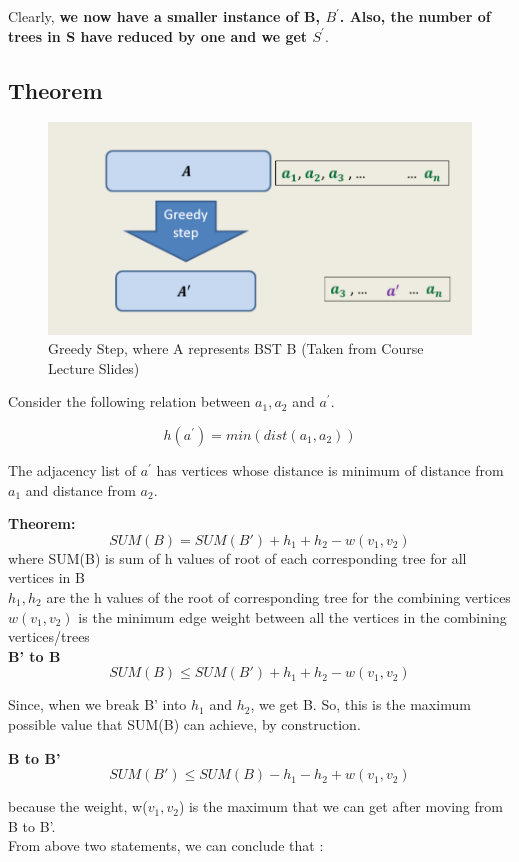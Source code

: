 \documentclass{article}
\begin{document}
Clearly, \textbf{we now have a smaller instance of B, \emph{$B^{'}$}. Also, the number of trees in S have reduced by one and we get \emph{$S^{'}$}}.
\newpage

\subsection{Theorem}
\begin{figure}[h!]
\begin{center}
\includegraphics[width=0.5\columnwidth]{greedy1.png}
\caption{Greedy Step, where A represents BST B (Taken from Course Lecture Slides)}
\label{fig:one}
\end{center}
\end{figure}

Consider the following relation between $a_1,a_2 $ and $a^{'}$.

$$h(a^{'})= min(dist(a_{1},a_{2}))$$

The adjacency list of $a^{'}$ has vertices whose distance is minimum of distance from $a_1$ and distance from $a_2$. 

\textbf{Theorem:}
$$SUM(B) = SUM(B') + h_1 + h_2- w(v_1,v_2)$$
where SUM(B) is sum of h values of root of each corresponding tree for all vertices in B \\
$h_1, h_2 $ are the h values of the root of corresponding tree for the combining vertices \\
$w(v_1,v_2)$ is the minimum edge weight between all the vertices in the combining vertices/trees\\

\textbf{B' to B }
$$ SUM(B) \leq SUM(B') + h_1+ h_2 - w(v_1,v_2)$$

Since, when we break B' into $h_1$ and $h_2$, we get B. So, this is the maximum possible value that SUM(B) can achieve, by construction.

\textbf{B to B' }
$$ SUM(B') \leq SUM(B) - h_1- h_2 + w(v_1,v_2)$$

because the weight, w($v_1,v_2$) is the maximum that we can get after moving from B to B'.\\

From above two statements, we can conclude that :
\end{document}

